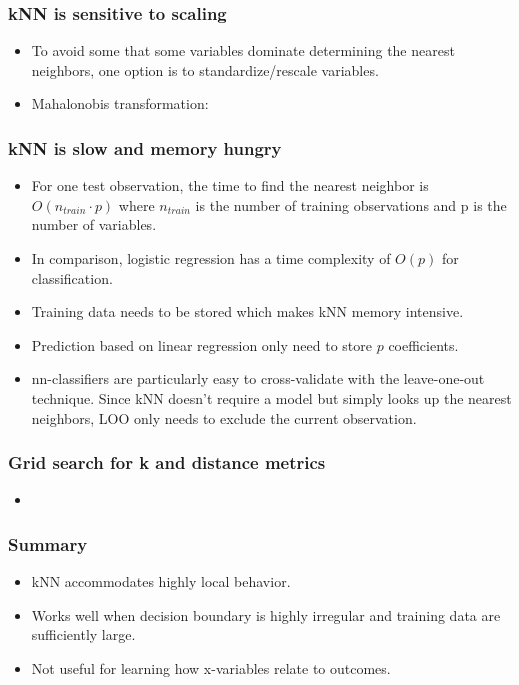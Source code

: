 \documentclass[12pt, oneside]{article}
\begin{document}
\subsubsection{kNN is sensitive to scaling}
\begin{itemize}
    \item To avoid some that some variables dominate determining the nearest neighbors, one option is to standardize/rescale variables. 
    \item Mahalonobis transformation: 
\end{itemize}

\subsubsection{kNN is slow and memory hungry}
\begin{itemize}
    \item For one test observation, the time to find the nearest neighbor is $O(n_{train} \cdot p)$ where $n_{train}$ is the number of training observations and p is the number of variables.
    \item In comparison, logistic regression has a time complexity of $O(p)$ for classification. 
    \item Training data needs to be stored which makes kNN memory intensive.
    \item Prediction based on linear regression only need to store $p$ coefficients.
    \item nn-classifiers are particularly easy to cross-validate with the leave-one-out technique. Since kNN doesn't require a model but simply looks up the nearest neighbors, LOO only needs to exclude the current observation.   
\end{itemize}

\subsubsection{Grid search for k and distance metrics}
\begin{itemize}
    \item 
\end{itemize}

\subsubsection{Summary}
\begin{itemize}
    \item kNN accommodates highly local behavior. 
    \item Works well when decision boundary is highly irregular and training data are sufficiently large.
    \item Not useful for learning how x-variables relate to outcomes.
\end{itemize}
\end{document}
